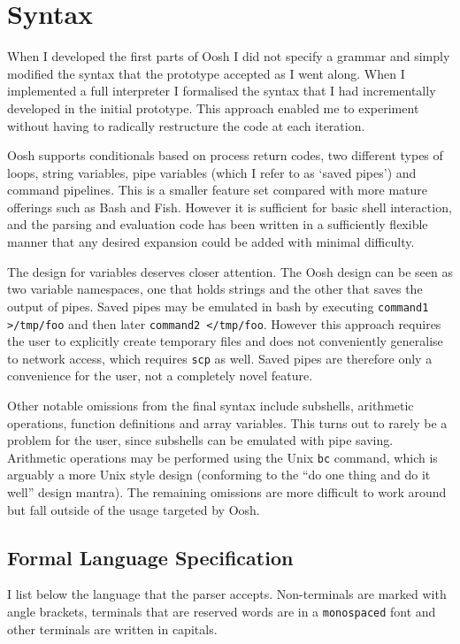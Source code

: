 \documentclass[12pt,twoside,notitlepage]{report}
\begin{document}
\section{Syntax}
When I developed the first parts of Oosh I did not specify a grammar and simply
modified the syntax that the prototype accepted as I went along. When I
implemented a full interpreter I formalised the syntax that I had
incrementally developed in the initial prototype. This
approach enabled me to experiment without having to radically restructure the
code at each iteration.

Oosh supports conditionals based on process return codes, two
different types of loops, string variables, pipe variables (which I
refer to as `saved pipes') and command pipelines. This is a smaller
feature set compared with more mature offerings such as Bash and
Fish. However it is sufficient for basic shell interaction, and the
parsing and evaluation code has been written in a sufficiently
flexible manner that any desired expansion could be added with minimal
difficulty.

The design for variables deserves closer attention. The Oosh design
can be seen as two variable namespaces, one that holds strings and the
other that saves the output of pipes. Saved pipes may be emulated in
bash by executing {\tt command1 >/tmp/foo} and then later {\tt command2
  </tmp/foo}. However this approach requires the user to explicitly
create temporary files and does not conveniently generalise to network
access, which requires {\tt scp} as well. Saved pipes are therefore
only a convenience for the user, not a completely novel feature.

Other notable omissions from the final syntax include subshells,
arithmetic operations, function definitions and array variables. This
turns out to rarely be a problem for the user, since subshells can be
emulated with pipe saving. Arithmetic operations may be performed
using the Unix {\tt bc} command, which is arguably a more Unix style
design (conforming to the ``do one thing and do it well'' design
mantra). The remaining omissions are more difficult to work around but
fall outside of the usage targeted by Oosh.

\subsection{Formal Language Specification}
I list below the language that the parser accepts. Non-terminals are
marked with angle brackets, terminals that are reserved words are in a
{\tt monospaced} font and other terminals are written in capitals.
\end{document}
